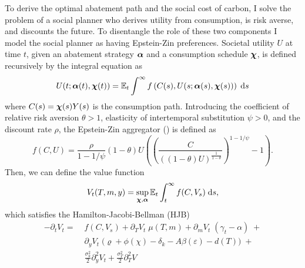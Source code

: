 \documentclass[../../main.tex]{subfiles}
\begin{document}
To derive the optimal abatement path and the social cost of carbon, I solve the problem of a social planner who derives utility from consumption, is risk averse, and discounts the future. To disentangle the role of these two components I model the social planner as having Epstein-Zin preferences. Societal utility $U$ at time $t$, given an abatement strategy $\bm{\alpha}$ and a consumption schedule $\bm{\chi}$, is defined recursively by the integral equation as \begin{equation} \label{eq:utility}
    U(t; \bm{\alpha}(t), \bm{\chi}(t)) = \operatorname{\mathbb{E}}_t \int^{\infty} f\left(C(s), U(s; \bm{\alpha}(s), \bm{\chi}(s))\right) \; \mathrm{d}s
\end{equation} where $C(s) = \bm{\chi}(s) Y(s)$ is the consumption path. Introducing the coefficient of relative risk aversion $\theta > 1$, elasticity of intertemporal substitution $\psi > 0$, and the discount rate $\rho$, the Epstein-Zin aggregator (\cite{duffie_asset_1992}) is defined as \begin{equation} \label{eq:aggregator}
    f(C, U) = \frac{\rho}{1 - 1 / \psi} (1 - \theta) U  \left( \left(\frac{C}{((1 - \theta) U)^{\frac{1}{1 - \theta}}}\right)^{1 - 1 / \psi} - 1 \right).
\end{equation} Then, we can define the value function \begin{equation}
    V_t(T, m, y) = \sup_{\bm{\chi}, \bm{\alpha}} \operatorname{\mathbb{E}}_t \int^{\infty}_t f(C, V_s) \; \mathrm{d}s,
\end{equation} which satisfies the  Hamilton-Jacobi-Bellman (HJB) \begin{equation}
    \begin{split}
        -\partial_t V_t = \; &f(C, V_s) + \partial_T V_t \; \mu(T, m) + \partial_m V_t \; (\gamma_t - \alpha) \; + \\
        &\partial_y V_t \; \Big(\varrho + \phi(\chi) - \delta_k - A \beta(\varepsilon) - d(T) \Big) \; + \\
        &\frac{\sigma^2_k}{2} \partial^2_y V_t + \frac{\sigma^2_T}{2} \partial^2_T V
    \end{split}
\end{equation}
\end{document}
